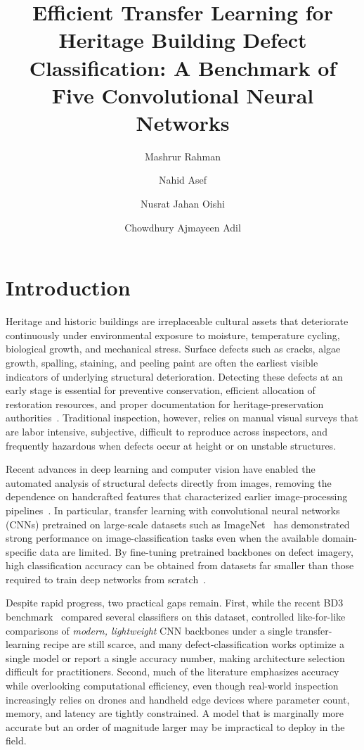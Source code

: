 \documentclass[ASNA, twocolumn]{USG}
\title{Efficient Transfer Learning for Heritage Building Defect Classification: A Benchmark of Five Convolutional Neural Networks}
\author[1]{Mashrur Rahman}
\author[1]{Nahid Asef}
\author[1]{Nusrat Jahan Oishi}
\author[1]{Chowdhury Ajmayeen Adil}
\begin{document}
\maketitle

\section{Introduction}

Heritage and historic buildings are irreplaceable cultural assets that deteriorate continuously under environmental exposure to moisture, temperature cycling, biological growth, and mechanical stress. Surface defects such as cracks, algae growth, spalling, staining, and peeling paint are often the earliest visible indicators of underlying structural deterioration. Detecting these defects at an early stage is essential for preventive conservation, efficient allocation of restoration resources, and proper documentation for heritage-preservation authorities~\cite{ref1}. Traditional inspection, however, relies on manual visual surveys that are labor intensive, subjective, difficult to reproduce across inspectors, and frequently hazardous when defects occur at height or on unstable structures.

Recent advances in deep learning and computer vision have enabled the automated analysis of structural defects directly from images, removing the dependence on handcrafted features that characterized earlier image-processing pipelines~\cite{ref5}. In particular, transfer learning with convolutional neural networks (CNNs) pretrained on large-scale datasets such as ImageNet~\cite{ref23} has demonstrated strong performance on image-classification tasks even when the available domain-specific data are limited. By fine-tuning pretrained backbones on defect imagery, high classification accuracy can be obtained from datasets far smaller than those required to train deep networks from scratch~\cite{ref22}.

Despite rapid progress, two practical gaps remain. First, while the recent BD3 benchmark~\cite{ref40} compared several classifiers on this dataset, controlled like-for-like comparisons of \emph{modern, lightweight} CNN backbones under a single transfer-learning recipe are still scarce, and many defect-classification works optimize a single model or report a single accuracy number, making architecture selection difficult for practitioners. Second, much of the literature emphasizes accuracy while overlooking computational efficiency, even though real-world inspection increasingly relies on drones and handheld edge devices where parameter count, memory, and latency are tightly constrained. A model that is marginally more accurate but an order of magnitude larger may be impractical to deploy in the field.
\end{document}
